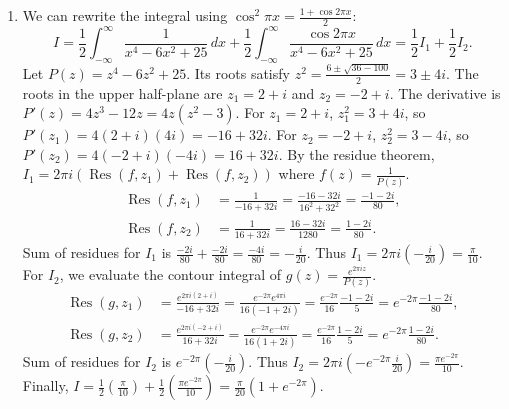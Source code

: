 \documentclass{article}
\begin{document}
\begin{enumerate}[label=\fbox{\arabic*}]
  \item %
        We can rewrite the integral using $\cos^2 \pi x = \frac{1 + \cos 2\pi x}{2}$:
        \[
          I = \frac{1}{2} \int_{-\infty}^\infty \frac{1}{x^4 - 6x^2 + 25} \, dx + \frac{1}{2} \int_{-\infty}^\infty \frac{\cos 2\pi x}{x^4 - 6x^2 + 25} \, dx = \frac{1}{2} I_1 + \frac{1}{2} I_2.
        \]
        Let $P(z) = z^4 - 6z^2 + 25$. Its roots satisfy $z^2 = \frac{6 \pm \sqrt{36 - 100}}{2} = 3 \pm 4i$.
        The roots in the upper half-plane are $z_1 = 2+i$ and $z_2 = -2+i$.
        The derivative is $P'(z) = 4z^3 - 12z = 4z(z^2 - 3)$.
        For $z_1 = 2+i$, $z_1^2 = 3+4i$, so $P'(z_1) = 4(2+i)(4i) = -16 + 32i$.
        For $z_2 = -2+i$, $z_2^2 = 3-4i$, so $P'(z_2) = 4(-2+i)(-4i) = 16 + 32i$.
        By the residue theorem, $I_1 = 2\pi i (\operatorname{Res}(f, z_1) + \operatorname{Res}(f, z_2))$ where $f(z) = \frac{1}{P(z)}$.
        \begin{align*}
          \operatorname{Res}(f, z_1) &= \frac{1}{-16+32i} = \frac{-16-32i}{16^2+32^2} = \frac{-1-2i}{80}, \\
          \operatorname{Res}(f, z_2) &= \frac{1}{16+32i} = \frac{16-32i}{1280} = \frac{1-2i}{80}.
        \end{align*}
        Sum of residues for $I_1$ is $\frac{-2i}{80} + \frac{-2i}{80} = \frac{-4i}{80} = -\frac{i}{20}$. Thus $I_1 = 2\pi i \left(-\frac{i}{20}\right) = \frac{\pi}{10}$.
        For $I_2$, we evaluate the contour integral of $g(z) = \frac{e^{2\pi i z}}{P(z)}$.
        \begin{align*}
          \operatorname{Res}(g, z_1) &= \frac{e^{2\pi i (2+i)}}{-16+32i} = \frac{e^{-2\pi} e^{4\pi i}}{16(-1+2i)} = \frac{e^{-2\pi}}{16} \frac{-1-2i}{5} = e^{-2\pi} \frac{-1-2i}{80}, \\
          \operatorname{Res}(g, z_2) &= \frac{e^{2\pi i (-2+i)}}{16+32i} = \frac{e^{-2\pi} e^{-4\pi i}}{16(1+2i)} = \frac{e^{-2\pi}}{16} \frac{1-2i}{5} = e^{-2\pi} \frac{1-2i}{80}.
        \end{align*}
        Sum of residues for $I_2$ is $e^{-2\pi} \left(-\frac{i}{20}\right)$. Thus $I_2 = 2\pi i \left(-e^{-2\pi}\frac{i}{20}\right) = \frac{\pi e^{-2\pi}}{10}$.
        Finally, $I = \frac{1}{2} \left(\frac{\pi}{10}\right) + \frac{1}{2} \left(\frac{\pi e^{-2\pi}}{10}\right) = \frac{\pi}{20}(1 + e^{-2\pi})$.


\end{enumerate}
\end{document}
